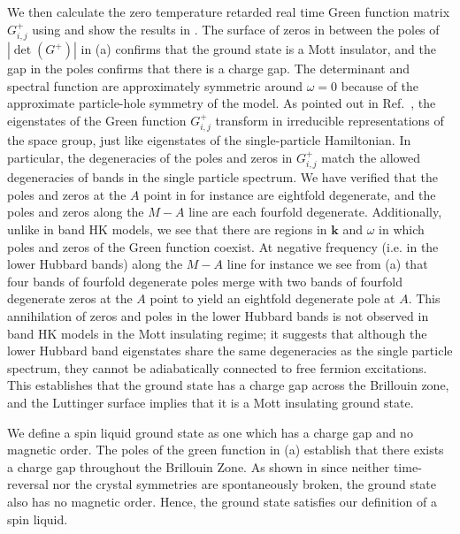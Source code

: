 \documentclass[prb,aps,amssymb,twocolumn,notitlepage]{revtex4-2}
\begin{document}
We then calculate the zero temperature retarded real time Green function matrix $G^{+}_{i,j}$ using  and show the results in .  
The surface of zeros in between the poles of $|\det(G^{+})|$ in (a) confirms that the ground state is a Mott insulator, and the gap in the poles confirms that there is a charge gap. 
The determinant and spectral function are approximately symmetric around $\omega=0$ because of the approximate particle-hole symmetry of the model. 
As pointed out in Ref.~\cite{setty2023symmetry}, the eigenstates of the Green function $G^{+}_{i,j}$ transform in irreducible representations of the space group, just like eigenstates of the single-particle Hamiltonian. 
In particular, the degeneracies of the poles and zeros in $G^{+}_{i,j}$ match the allowed degeneracies of bands in the single particle spectrum. 
We have verified that the poles and zeros at the $A$ point in  for instance are eightfold degenerate, and the poles and zeros along the $M-A$ line are each fourfold degenerate. 
Additionally, unlike in band HK models, we see that there are regions in $\mathbf{k}$ and $\omega$ in which poles and zeros of the Green function coexist. 
At negative frequency (i.e. in the lower Hubbard bands) along the $M-A$ line for instance we see from (a) that four bands of fourfold degenerate poles merge with two bands of fourfold degenerate zeros at the $A$ point to yield an eightfold degenerate pole at $A$. 
This annihilation of zeros and poles in the lower Hubbard bands is not observed in band HK models in the Mott insulating regime; it suggests that although the lower Hubbard band eigenstates share the same degeneracies as the single particle spectrum, they cannot be adiabatically connected to free fermion excitations. 
This establishes that the ground state has a charge gap across the Brillouin zone, and the Luttinger surface implies that it is a Mott insulating ground state. 


We define a spin liquid ground state as one which has a charge gap and no magnetic order.
The poles of the green function in (a) establish that there exists a charge gap throughout the Brillouin Zone.
As shown in  since neither time-reversal nor the crystal symmetries are spontaneously broken, the ground state also has no magnetic order. Hence, the ground state satisfies our definition of a spin liquid.
\end{document}
